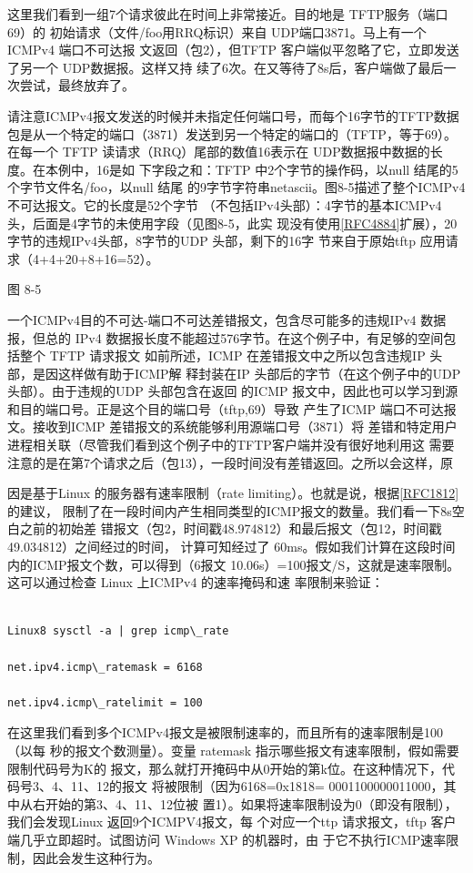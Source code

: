 这里我们看到一组7个请求彼此在时间上非常接近。目的地是 TFTP服务（端口 69）的
初始请求（文件/foo用RRQ标识）来自 UDP端口3871。马上有一个ICMPv4 端口不可达报
文返回（包2），但TFTP 客户端似平忽略了它，立即发送了另一个 UDP数据报。这样又持
续了6次。在又等待了8s后，客户端做了最后一次尝试，最终放弃了。

请注意ICMPv4报文发送的时候并未指定任何端口号，而每个16字节的TFTP数据
包是从一个特定的端口（3871）发送到另一个特定的端口的（TFTP，等于69）。在每一个
TFTP 读请求（RRQ）尾部的数值16表示在 UDP数据报中数据的长度。在本例中，16是如
下字段之和：TFTP 中2个字节的操作码，以null 结尾的5个字节文件名/foo，以null 结尾
的9字节字符串netascii。图8-5描述了整个ICMPv4不可达报文。它的长度是52个字节
（不包括IPv4头部）：4字节的基本ICMPv4 头，后面是4字节的未使用字段（见图8-5，此实
现没有使用\href{https://www.rfc-editor.org/rfc/rfc4884}{[RFC4884]}扩展），20字节的违规IPv4头部，8字节的UDP
头部，剩下的16字
节来自于原始tftp 应用请求（4+4+20+8+16=52）。

图 8-5

一个ICMPv4目的不可达-端口不可达差错报文，包含尽可能多的违规IPv4 数据报，但总的
IPv4 数据报长度不能超过576字节。在这个例子中，有足够的空间包括整个 TFTP 请求报文
如前所述，ICMP 在差错报文中之所以包含违规IP 头部，是因这样做有助于ICMP解
释封装在IP 头部后的字节（在这个例子中的UDP头部）。由于违规的UDP 头部包含在返回
的ICMP 报文中，因此也可以学习到源和目的端口号。正是这个目的端口号（tftp,69）导致
产生了ICMP 端口不可达报文。接收到ICMP 差错报文的系统能够利用源端口号（3871）将
差错和特定用户进程相关联（尽管我们看到这个例子中的TFTP客户端并没有很好地利用这
需要注意的是在第7个请求之后（包13），一段时间没有差错返回。之所以会这样，原

因是基于Linux 的服务器有速率限制（rate
limiting）。也就是说，根据\href{https://www.rfc-editor.org/rfc/rfc1812}{[RFC1812]}的建议，
限制了在一段时间内产生相同类型的ICMP报文的数量。我们看一下8s空白之前的初始差
错报文（包2，时间戳48.974812）和最后报文（包12，时间戳49.034812）之间经过的时间，
计算可知经过了 60ms。假如我们计算在这段时间内的ICMP报文个数，可以得到（6报文
10.06s）=100报文/S，这就是速率限制。这可以通过检查 Linux 上ICMPv4 的速率掩码和速
率限制来验证：

\begin{verbatim}

Linux8 sysctl -a | grep icmp\_rate

net.ipv4.icmp\_ratemask = 6168

net.ipv4.icmp\_ratelimit = 100
\end{verbatim}

在这里我们看到多个ICMPv4报文是被限制速率的，而且所有的速率限制是100（以每
秒的报文个数测量）。变量 ratemask 指示哪些报文有速率限制，假如需要限制代码号为K的
报文，那么就打开掩码中从0开始的第k位。在这种情况下，代码号3、4、11、12的报文
将被限制（因为6168=0x1818= 0001100000011000，其中从右开始的第3、4、11、12位被
置1）。如果将速率限制设为0（即没有限制），我们会发现Linux 返回9个ICMPV4报文，每
个对应一个ttp 请求报文，tftp 客户端几乎立即超时。试图访问 Windows XP 的机器时，由
于它不执行ICMP速率限制，因此会发生这种行为。

